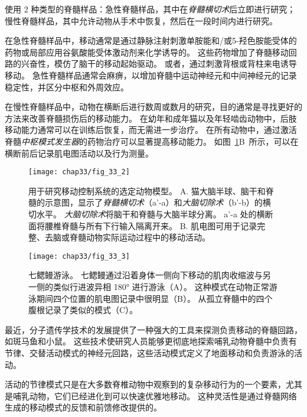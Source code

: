 \begin{proposition}[用于研究移动神经元控制的样品]
	\quad \quad 使用 2 种类型的脊髓样品：急性脊髓样品，其中在\textit{脊髓横切术}后立即进行研究；
	慢性脊髓样品，其中允许动物从手术中恢复，然后在一段时间内进行研究。
	
	\quad \quad 在急性脊髓样品中，移动通常是通过静脉注射刺激单胺能和/或5-羟色胺能受体的药物或局部应用谷氨酸能受体激动剂来化学诱导的。
	这些药物增加了脊髓移动回路的兴奋性，模仿了脑干的移动起始驱动。
	或者，通过刺激背根或背柱来电诱导移动。
	急性脊髓样品通常会麻痹，以增加脊髓中运动神经元和中间神经元的记录稳定性，并区分中枢和外周效应。
	
	\quad \quad 在慢性脊髓样品中，动物在横断后进行数周或数月的研究，目的通常是寻找更好的方法来改善脊髓损伤后的移动能力。
	在幼年和成年猫以及年轻啮齿动物中，后肢移动能力通常可以在训练后恢复，而无需进一步治疗。
	在所有动物中，通过激活脊髓\textit{中枢模式发生器}的药物治疗可以显著提高移动能力。
	如图~\ref{fig:33_2}B~所示，可以在横断前后记录肌电图活动以及行为测量。
	
\end{proposition}


\begin{figure}[htbp]
	\centering
	\texttt{[image: chap33/fig\_33\_2]}
	\caption{用于研究移动控制系统的选定动物模型。
	A. 猫大脑半球、脑干和脊髓的示意图，显示了\textit{脊髓横切术}（a'-a）和\textit{大脑切除术}（b'-b）的横切水平。
	\textit{大脑切除术}将脑干和脊髓与大脑半球分离。
	a'-a 处的横断面将腰椎脊髓与所有下行输入隔离开来。
	B. 肌电图可用于记录完整、去脑或脊髓动物实际运动过程中的移动活动。}
	\label{fig:33_2}
\end{figure}


\begin{figure}[htbp]
	\centering
	\texttt{[image: chap33/fig\_33\_3]}
	\caption{七鳃鳗游泳。
	七鳃鳗通过沿着身体一侧向下移动的肌肉收缩波与另一侧的类似行进波异相 180° 进行游泳（A）。
	这种模式在动物正常游泳期间四个位置的肌电图记录中很明显（B）。
	从孤立脊髓中的四个腹根记录了类似的模式（C）。}
	\label{fig:33_3}
\end{figure}


最近，分子遗传学技术的发展提供了一种强大的工具来探测负责移动的脊髓回路，如斑马鱼和小鼠。
这些技术使研究人员能够更彻底地探索哺乳动物脊髓中负责有节律、交替活动模式的神经元回路，这些活动模式定义了地面移动和负责游泳的活动。


活动的节律模式只是在大多数脊椎动物中观察到的复杂移动行为的一个要素，尤其是哺乳动物，它们已经进化到可以快速优雅地移动。
这种灵活性是通过脊髓网络生成的移动模式的反馈和前馈修改提供的。


